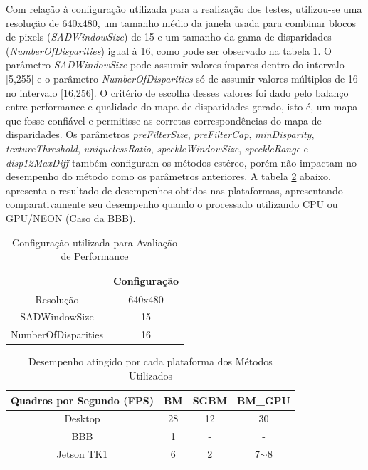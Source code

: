 Com relação à configuração utilizada para a realização dos testes, utilizou-se uma resolução de 640x480, um tamanho médio da janela usada para combinar blocos de pixels (\textit{SADWindowSize}) de 15 e um tamanho da gama de disparidades (\textit{NumberOfDisparities}) igual à 16, como pode ser observado na tabela \ref{teste_values}. O parâmetro \textit{SADWindowSize} pode assumir valores ímpares dentro do intervalo [5,255] e o parâmetro \textit{NumberOfDisparities} só de assumir valores múltiplos de 16 no intervalo [16,256]. O critério de escolha desses valores foi dado pelo balanço entre performance e qualidade do mapa de disparidades gerado, isto é, um mapa que fosse confiável e permitisse as corretas correspondências do mapa de disparidades. Os parâmetros \textit{preFilterSize}, \textit{preFilterCap}, \textit{minDisparity}, \textit{textureThreshold}, \textit{uniquelessRatio}, \textit{speckleWindowSize}, \textit{speckleRange} e \textit{disp12MaxDiff} também configuram os métodos estéreo, porém não impactam no desempenho do método como os parâmetros anteriores. A tabela \ref{resultsCPUGPU} abaixo, apresenta o resultado de desempenhos obtidos nas plataformas, apresentando comparativamente seu desempenho quando o processado utilizando CPU ou GPU/NEON (Caso da BBB).

\begin{table}[h]
\centering
\caption{Configuração utilizada para Avaliação de Performance}
\label{teste_values}
\begin{tabular}{|c|c|}
\hline
                    & Configuração \\ \hline
Resolução           & 640x480      \\ \hline
SADWindowSize       & 15           \\ \hline
NumberOfDisparities & 16           \\ \hline
\end{tabular}
\end{table}

\begin{table}[h]
\centering
\caption{Desempenho atingido por cada plataforma dos Métodos Utilizados}
\label{resultsCPUGPU}
\begin{tabular}{|c|c|c|c|}
\hline
Quadros por Segundo (FPS)       & BM & SGBM & BM\_GPU  \\ \hline
Desktop   & 28 & 12   & 30       \\ \hline
BBB       & 1  & -    & -        \\ \hline
Jetson TK1 & 6  & 2    & 7$\sim$8 \\ \hline
\end{tabular}
\end{table}

